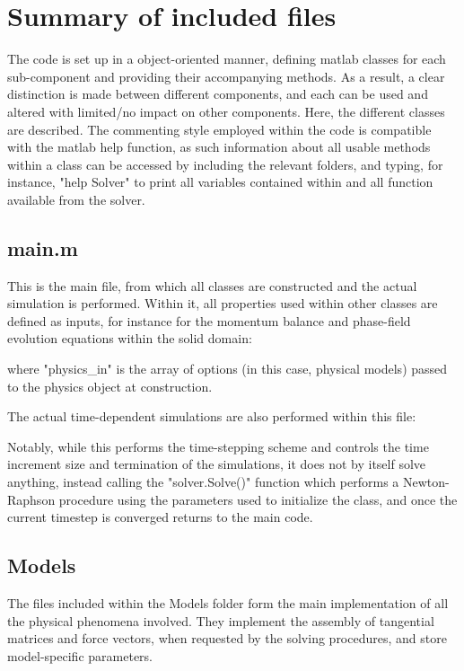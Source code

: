 \documentclass[3p]{elsarticle} %
\begin{document}
\section{Summary of included files}
The code is set up in a object-oriented manner, defining matlab classes for each sub-component and providing their accompanying methods. As a result, a clear distinction is made between different components, and each can be used and altered with limited/no impact on other components. Here, the different classes are described. The commenting style employed within the code is compatible with the matlab help function, as such information about all usable methods within a class can be accessed by including the relevant folders, and typing, for instance, "help Solver" to print all variables contained within and all function available from the solver. 

\subsection{main.m}
This is the main file, from which all classes are constructed and the actual simulation is performed. Within it, all properties used within other classes are defined as inputs, for instance for the momentum balance and phase-field evolution equations within the solid domain:

where "physics{\_}in" is the array of options (in this case, physical models) passed to the physics object at construction. 

The actual time-dependent simulations are also performed within this file:


Notably, while this performs the time-stepping scheme and controls the time increment size and termination of the simulations, it does not by itself solve anything, instead calling the "solver.Solve()" function which performs a Newton-Raphson procedure using the parameters used to initialize the class, and once the current timestep is converged returns to the main code.

\subsection{Models}
The files included within the Models folder form the main implementation of all the physical phenomena involved. They implement the assembly of tangential matrices and force vectors, when requested by the solving procedures, and store model-specific parameters. 
\end{document}
